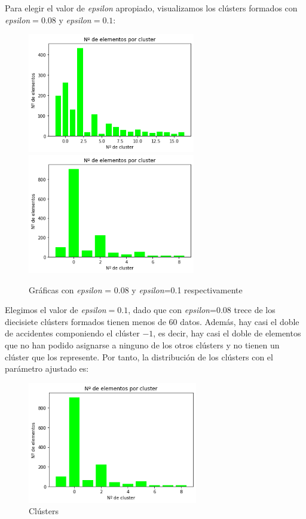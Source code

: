 \documentclass[a4]{article}
\begin{document}
Para elegir el valor de \textit{epsilon} apropiado, visualizamos los clústers formados con \textit{epsilon}$ = 0.08$ y \textit{epsilon}$=0.1$:

\begin{figure}[H]
  \centering
  \caption{Gráficas con \textit{epsilon} = 0.08 y \textit{epsilon}=0.1 respectivamente}
  \includegraphics[width=73mm]{imagenes/c1_dbscan_cluster_008}
  \includegraphics[width=73mm]{imagenes/c1_dbscan_cluster_01}
\end{figure}

Elegimos el valor de \textit{epsilon}$ = 0.1$, dado que con \textit{epsilon}=0.08 trece de los diecisiete clústers formados tienen menos de 60 datos. Además, hay casi el doble de accidentes componiendo el clúster $-1$, es decir, hay casi el doble de elementos que no han podido asignarse a ninguno de los otros clústers y no tienen un clúster que los represente. Por tanto, la distribución de los clústers con el parámetro ajustado es:

\begin{figure}[H]
  \centering
  \caption{Clústers}
  \includegraphics[width=74mm]{imagenes/c1_dbscan_cluster_01}
\end{figure}
\end{document}
